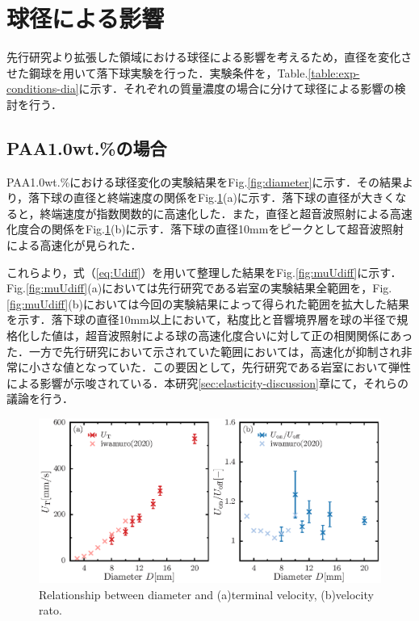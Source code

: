 \section{球径による影響}
\label{sec:diameter}
先行研究より拡張した領域における球径による影響を考えるため，直径を変化させた鋼球を用いて落下球実験を行った．実験条件を，Table.\ref{table:exp-conditions-dia}に示す．それぞれの質量濃度の場合に分けて球径による影響の検討を行う．

\subsection{PAA1.0wt.\%の場合}
PAA1.0wt.\%における球径変化の実験結果をFig.\ref{fig:diameter}に示す．その結果より，落下球の直径と終端速度の関係をFig.\ref{fig:diaUT}(a)に示す．落下球の直径が大きくなると，終端速度が指数関数的に高速化した．また，直径と超音波照射による高速化度合の関係をFig.\ref{fig:diaUT}(b)に示す．落下球の直径10mmをピークとして超音波照射による高速化が見られた．

これらより，式（\ref{eq:Udiff}）を用いて整理した結果をFig.\ref{fig:muUdiff}に示す．Fig.\ref{fig:muUdiff}(a)においては先行研究である岩室\cite{ref:8}の実験結果全範囲を，Fig.\ref{fig:muUdiff}(b)においては今回の実験結果によって得られた範囲を拡大した結果を示す．落下球の直径10mm以上において，粘度比と音響境界層を球の半径で規格化した値は，超音波照射による球の高速化度合いに対して正の相関関係にあった．一方で先行研究において示されていた範囲においては，高速化が抑制され非常に小さな値となっていた．この要因として，先行研究である岩室\cite{ref:8}において弾性による影響が示唆されている．本研究\ref{sec:elasticity-discussion}章にて，それらの議論を行う．

\begin{figure}[ht]
    \centering
    \includegraphics[width=1\textwidth]{./5-Results/diaUT_Udiff.eps}
    \caption{Relationship between diameter and (a)terminal velocity, (b)velocity rato.}
    \label{fig:diaUT}
\end{figure}

